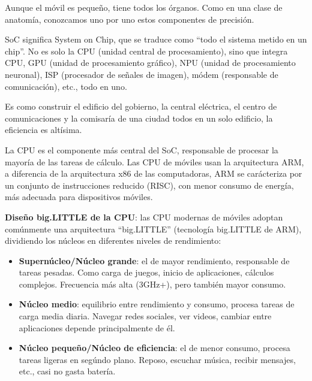


Aunque el móvil es pequeño, tiene todos los órganos. Como en una clase de anatomía, conozcamos uno por uno estos componentes de precisión.


SoC significa System on Chip, que se traduce como “todo el sistema metido en un chip”. No es solo la CPU (unidad central de procesamiento), sino que integra CPU, GPU (unidad de procesamiento gráfico), NPU (unidad de procesamiento neuronal), ISP (procesador de señales de imagen), módem (responsable de comunicación), etc., todo en uno.

Es como construir el edificio del gobierno, la central eléctrica, el centro de comunicaciones y la comisaría de una ciudad todos en un solo edificio, la eficiencia es altísima.


La CPU es el componente más central del SoC, responsable de procesar la mayoría de las tareas de cálculo. Las CPU de móviles usan la arquitectura ARM, a diferencia de la arquitectura x86 de las computadoras, ARM se carácteriza por un conjunto de instrucciones reducido (RISC), con menor consumo de energía, más adecuada para dispositivos móviles.

\textbf{Diseño big.LITTLE de la CPU}: las CPU modernas de móviles adoptan comúnmente una arquitectura “big.LITTLE” (tecnología big.LITTLE de ARM), dividiendo los núcleos en diferentes niveles de rendimiento:

\begin{itemize}
  \item \textbf{Supernúcleo/Núcleo grande}: el de mayor rendimiento, responsable de tareas pesadas. Como carga de juegos, inicio de aplicaciones, cálculos complejos. Frecuencia más alta (3GHz+), pero también mayor consumo.
  \item \textbf{Núcleo medio}: equilibrio entre rendimiento y consumo, procesa tareas de carga media diaria. Navegar redes sociales, ver videos, cambiar entre aplicaciones depende principalmente de él.
  \item \textbf{Núcleo pequeño/Núcleo de eficiencia}: el de menor consumo, procesa tareas ligeras en segúndo plano. Reposo, escuchar música, recibir mensajes, etc., casi no gasta batería.
\end{itemize}


